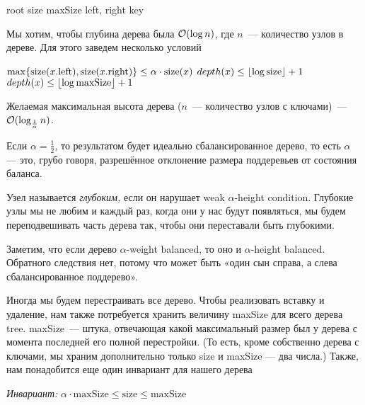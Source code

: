 \begin{algorithmic}[0]
	\algrenewcommand{}
		\State root
		\State size
		\State maxSize
	\EndProcedure
		\State left, right
		\State key
	\EndProcedure
\end{algorithmic}

Мы хотим, чтобы глубина дерева была $\BigO(\log n)$, где $n$~--- количество узлов в дереве. Для этого заведем несколько условий

\begin{algorithmic}[0]
	\algrenewcommand{}
		\State $\max \set*{\size (x.\text{left}), \size (x.\text{right})} \leq \alpha \cdot \size (x)$
	\EndProcedure
		\State $depth(x) \leq \floor*{\log \text{size}} + 1$
	\EndProcedure
		\State $depth(x) \leq \floor*{\log \text{maxSize}} + 1$ 
	\EndProcedure
\end{algorithmic}

Желаемая максимальная высота дерева ($n$~— количество узлов с ключами)~— $\BigO(\log_{\frac{1}{\alpha}} n)$.

Если $\alpha = \frac{1}{2}$, то результатом будет идеально сбалансированное дерево, то есть $\alpha$ — это, грубо говоря, разрешённое отклонение размера поддеревьев от состояния баланса.

Узел называется {\it глубоким,} если он нарушает weak $\alpha$-height condition. Глубокие узлы мы не любим и каждый раз, когда они у нас будут появляться, мы будем переподвешивать часть дерева так, чтобы они переставали быть глубокими.

Заметим, что если дерево $\alpha$-weight balanced, то оно и $\alpha$-height balanced. Обратного следствия нет, потому что может быть «один сын справа, а слева сбалансированное поддерево».

Иногда мы будем перестраивать все дерево. Чтобы реализовать вставку и удаление, нам также потребуется хранить величину maxSize для всего дерева tree. maxSize~— штука, отвечающая какой максимальный размер был у дерева с момента последней его полной перестройки. (То есть, кроме собственно дерева с ключами, мы храним дополнительно только size и maxSize — два числа.) Также, нам понадобится еще один инвариант для нашего дерева

{\it Инвариант:} $\alpha \cdot \text{maxSize} \leq \text{size} \leq \text{maxSize}$

